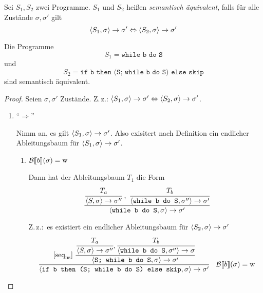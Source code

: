 \begin{definition}
    Sei $S_1, S_2$ zwei Programme. $S_1$ und $S_2$ heißen \emph{semantisch äquivalent}, falls für alle Zustände $\sigma, \sigma'$ gilt
    \[
    \langle S_1, \sigma \rangle \to \sigma' \Leftrightarrow \langle S_2, \sigma \rangle \to \sigma'
    \]
\end{definition}

\begin{example}
    Die Programme
    \[
    S_1 = \texttt{while b do S}
    \]
    und
    \[
    S_2 = \texttt{if b then (S; while b do S) else skip}
    \]
    sind semantisch äquivalent.
\end{example}
\begin{proof}
    Seien $\sigma, \sigma'$ Zustände. Z.\,z.: $\langle S_1, \sigma \rangle \to \sigma' \Leftrightarrow \langle S_2, \sigma \rangle \to \sigma'$.

    \begin{enumerate}
        \item ``$\Rightarrow$''

            Nimm an, es gilt $\langle S_1, \sigma \rangle \to \sigma'$. Also exisitert nach Definition ein endlicher Ableitungsbaum für $\langle S_1, \sigma \rangle \to \sigma'$.
            \begin{enumerate}
                \item $\mathcal{B}\mathrm{[}\kern-.14em\mathrm{[} b\mathrm{]}\kern-.14em\mathrm{]}(\sigma) = \operatorname{w}$

                    Dann hat der Ableitungsbaum $T_1$ die Form
                    \begin{align*}
                        [\text{while}_{\text{ns}}^{\true}]\;
                        \cfrac{
                            \cfrac{T_a}{\strans{S}{\sigma}{\sigma''}}
                            \;,\;
                            \cfrac{T_b}{\strans{\texttt{while b do S}}{\sigma''}{\sigma'}}
                        }{
                            \strans{\texttt{while b do S}}{\sigma}{\sigma'}
                        }
                    \end{align*}

                    Z.\,z.:\ es existiert ein endlicher Ableitungsbaum für $\langle S_2, \sigma \rangle \to \sigma'$
                    \begin{align*}
                        [\text{if}_{\text{ns}}^{\true}]\;
                        \cfrac{
                            [\text{seq}_{\text{ns}}]\;
                            \cfrac{
                                \cfrac{T_a}{\strans{S}{\sigma}{\sigma''}}
                                ,
                                \cfrac{T_b}{\strans{\texttt{while b do S}}{\sigma''}{\sigma}}
                            }{
                                \strans{\texttt{S; while b do S}}{\sigma}{\sigma'}
                            }
                        }{
                            \strans{\texttt{if b then (S; while b do S) else skip}}{\sigma}{\sigma'}
                        }
                        \quad
                        \Bsem{b}(\sigma) = \true
                    \end{align*}


\end{enumerate}
\end{enumerate}
\end{proof}
